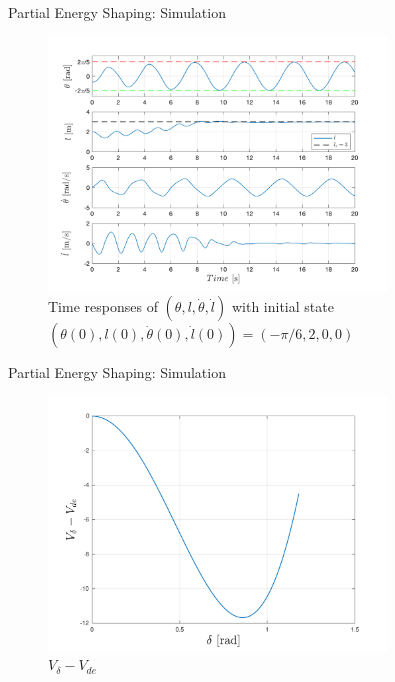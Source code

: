 \documentclass[10pt]{beamer}
\begin{document}
  \begin{frame}{Partial Energy Shaping: Simulation}
    \begin{figure}
      \caption*{Time responses of $(\theta, l, \dot{\theta}, \dot{l})$ with 
        initial state $(\theta(0), l(0), \dot{\theta}(0), \dot{l}(0))=
        (-\pi/6, 2, 0, 0)$}
      \vspace{-0.3cm}
      \includegraphics[width=0.8\textwidth]{images/partial_2.pdf}
    \end{figure}
  \end{frame}

  \begin{frame}{Partial Energy Shaping: Simulation}
    \begin{figure}
      \caption*{$V_\delta-V_{de}$}
      \vspace{-0.3cm}
      \includegraphics[width=0.8\textwidth]{images/partial_3.pdf}
    \end{figure}
  \end{frame}
\end{document}
